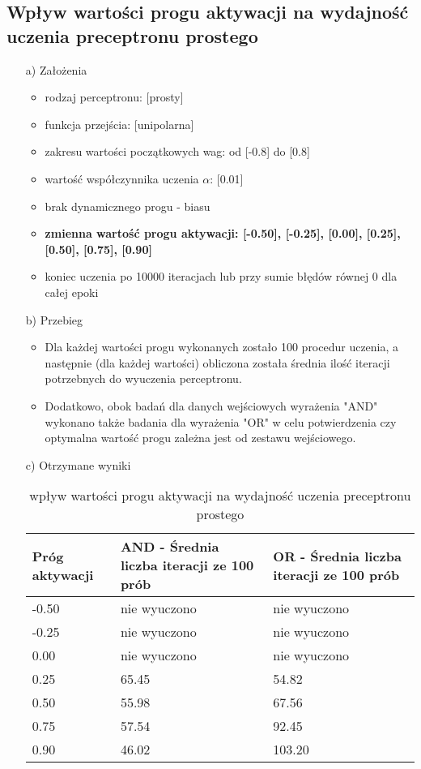 \documentclass[17pt]{article}
\begin{document}
\subsection{Wpływ wartości progu aktywacji na wydajność uczenia preceptronu prostego}
\vspace{4mm}
\begin{enumerate}

\item[a)] Założenia

\begin{itemize}
\item rodzaj perceptronu: [prosty]
\item funkcja przejścia: [unipolarna]
\item zakresu wartości początkowych wag: od [-0.8] do [0.8]
\item wartość współczynnika uczenia $\alpha$: [0.01]
\item brak dynamicznego progu - biasu
\item \textbf{zmienna wartość progu aktywacji: [-0.50], [-0.25], [0.00], [0.25], [0.50], [0.75], [0.90]}
\item koniec uczenia po 10000 iteracjach lub przy sumie błędów równej 0 dla całej epoki
\end{itemize}

\item[b)] Przebieg

\begin{itemize}
\item Dla każdej wartości progu wykonanych zostało 100 procedur uczenia, a następnie (dla każdej wartości) obliczona została średnia ilość iteracji potrzebnych do wyuczenia perceptronu.
\item Dodatkowo, obok badań dla danych wejściowych wyrażenia "AND" wykonano także badania dla wyrażenia "OR" w celu potwierdzenia czy optymalna wartość progu zależna jest od zestawu wejściowego.
\end{itemize}
\item[c)] Otrzymane wyniki

\begin{table}[ht]
\centering
\begin{tabular}{|p{4cm}|p{4cm}|p{4cm}|}
 \hline
 Próg aktywacji & AND - Średnia liczba iteracji ze 100 prób & OR - Średnia liczba iteracji ze 100 prób\\ \hline
 -0.50 & nie wyuczono & nie wyuczono\\ 
 -0.25 & nie wyuczono & nie wyuczono\\ 
 0.00 & nie wyuczono & nie wyuczono\\ 
 0.25 & 65.45 & 54.82\\ 
 0.50 & 55.98 & 67.56\\ 
 0.75 & 57.54 & 92.45\\ 
 0.90 & 46.02 & 103.20\\ 
 \hline
\end{tabular}
\caption{\label{tab:table1}wpływ wartości progu aktywacji na wydajność uczenia preceptronu prostego}
\end{table}


\end{enumerate}
\end{document}

